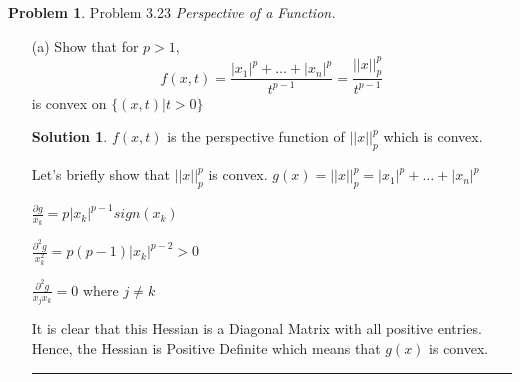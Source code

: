 \documentclass{article}
\theoremstyle{definition}
\newtheorem{problem}{Problem}
\def\fline{\rule{0.75\linewidth}{0.5pt}}
\newcommand{\finishline}{\begin{center}\fline\end{center}}
\newtheorem*{solution*}{Solution}
\newenvironment{solution}{\begin{solution*}}{{\finishline} \end{solution*}}
\begin{document}
\begin{problem} Problem 3.23
    \textit{Perspective of a Function.}

    \begin{itemize}
        \item[(a)] Show that for $p > 1$, 
        \begin{equation}
            f(x, t) = \frac{|x_1|^p + \dots + |x_n|^p}{t^{p - 1}} = \frac{||x||_p^p}{t^{p - 1}}
        \end{equation}
        is convex on $\{ (x, t) | t > 0\}$

        \begin{solution}
            $f(x, t)$ is the perspective function of $||x||_p^p$ which is convex. 

            Let's briefly show that $||x||_p^p$ is convex. \newline 
            $g(x) = ||x||_p^p = |x_1|^p + \dots + |x_n|^p$ \newline 

            $\frac{\partial g}{x_k} = p |x_k|^{p - 1} sign(x_k)$

            $\frac{\partial^2 g}{x_k^2} = p(p - 1) |x_k|^{p - 2} > 0$

            $\frac{\partial^2 g}{x_j x_k} =0$ where $j \neq k$

            It is clear that this Hessian is a Diagonal Matrix with all positive entries. Hence, the Hessian is Positive Definite which means that $g(x)$ is convex. 
        \end{solution}
    \end{itemize}
\end{problem}
\newpage
\end{document}

